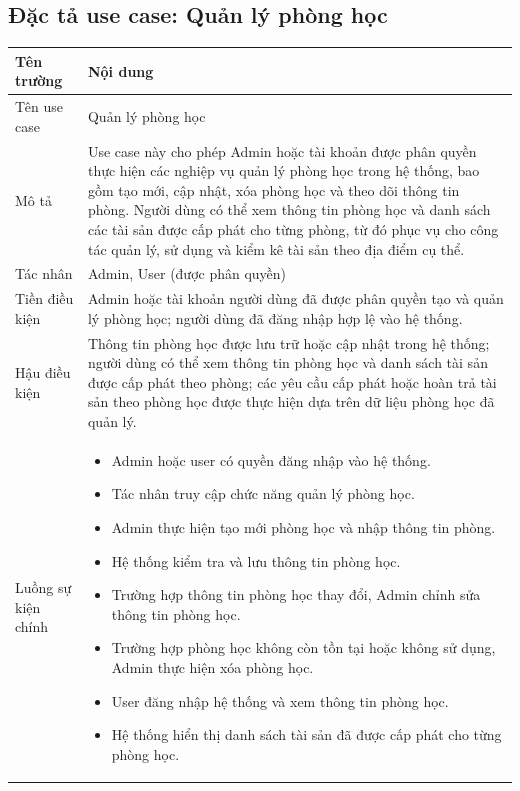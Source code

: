 \documentclass[../DoAn.tex]{subfiles}
\begin{document}
\subsection{Đặc tả use case: Quản lý phòng học}

\begin{table}[H]
\centering
\renewcommand{\arraystretch}{1.4}
\begin{tabular}{|p{4cm}|p{11cm}|}
\hline
\textbf{Tên trường} & \textbf{Nội dung} \\
\hline

Tên use case &
Quản lý phòng học \\
\hline

Mô tả &
Use case này cho phép Admin hoặc tài khoản được phân quyền thực hiện các nghiệp vụ quản lý phòng học trong hệ thống, bao gồm tạo mới, cập nhật, xóa phòng học và theo dõi thông tin phòng. Người dùng có thể xem thông tin phòng học và danh sách các tài sản được cấp phát cho từng phòng, từ đó phục vụ cho công tác quản lý, sử dụng và kiểm kê tài sản theo địa điểm cụ thể. \\
\hline

Tác nhân &
Admin, User (được phân quyền) \\
\hline

Tiền điều kiện &
Admin hoặc tài khoản người dùng đã được phân quyền tạo và quản lý phòng học; người dùng đã đăng nhập hợp lệ vào hệ thống. \\
\hline

Hậu điều kiện &
Thông tin phòng học được lưu trữ hoặc cập nhật trong hệ thống; người dùng có thể xem thông tin phòng học và danh sách tài sản được cấp phát theo phòng; các yêu cầu cấp phát hoặc hoàn trả tài sản theo phòng học được thực hiện dựa trên dữ liệu phòng học đã quản lý. \\
\hline

Luồng sự kiện chính &
\begin{itemize}
    \item Admin hoặc user có quyền đăng nhập vào hệ thống.
    \item Tác nhân truy cập chức năng quản lý phòng học.
    \item Admin thực hiện tạo mới phòng học và nhập thông tin phòng.
    \item Hệ thống kiểm tra và lưu thông tin phòng học.
    \item Trường hợp thông tin phòng học thay đổi, Admin chỉnh sửa thông tin phòng học.
    \item Trường hợp phòng học không còn tồn tại hoặc không sử dụng, Admin thực hiện xóa phòng học.
    \item User đăng nhập hệ thống và xem thông tin phòng học.
    \item Hệ thống hiển thị danh sách tài sản đã được cấp phát cho từng phòng học.
\end{itemize} \\
\hline


\end{tabular}
\end{table}
\end{document}
